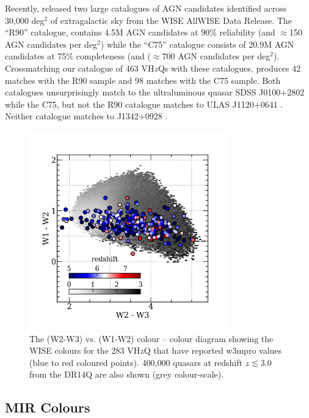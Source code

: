 \documentclass[usenatbib]{mnras}
\begin{document}
\citet{Blain2013} 

Recently, \citet{Assef2018} released two large catalogues of AGN 
candidates identified across 30,000 deg$^2$ of extragalactic sky 
from the WISE AllWISE Data Release. The ``R90'' catalogue, 
contains 4.5M AGN candidates at 90\% reliability (and $\approx$150 
AGN candidates per deg$^2$) while the ``C75'' catalogue  
consists of 20.9M AGN candidates at 75\% completeness (and 
($\approx$700 AGN candidates per deg$^2$).  Crossmatching 
our catalogue of 463 VH$z$Qs with these catalogues, produces 
42 matches with	the R90 sample and 98 matches with the C75 sample. 
Both catalogues unsurprisingly match to the ultraluminous quasar 
SDSS J0100+2802 \citep{Wu2015} while the C75, but not the R90 catalogue 
matches to ULAS J1120+0641 \citep{Mortlock2011}. Neither catalogue 
matches to J1342+0928 \citep{Banados2018}. 


\begin{figure}
    \centering
    \includegraphics[width=8.6cm,  clip, trim=6mm 4mm 6mm 10mm]
    {../color_color/W1W2_plots/W1W2W3_hexplots_20190610v2.png} 
  \vspace{-14pt}
    \caption{The (W2-W3) vs. (W1-W2) colour – colour diagram showing the WISE colours 
      for the 283 VH$z$Q that have reported w3mpro values (blue to red coloured points).
      400,000 quasars at redshift $z\lesssim3.0$ from the DR14Q are also shown
      (grey colour-scale). }
    \label{fig:W1W2W3}
\end{figure}

\subsection{MIR Colours}
\end{document}
